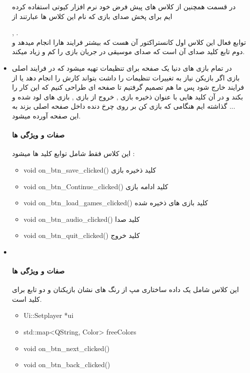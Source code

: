\documentclass[pdf,titlepage,a4paper]{report}
\begin{document}
\begin{itemize}
		در قسمت
		همچنین از کلاس های پیش فرض خود نرم افزار کیوتی استفاده کرده ایم برای پخش صدای بازی که نام این کلاس ها عبارتند از 
		
		,  . \\
		 توابع فعال این کلاس اول کانستراکتور آن هست که بیشتر فرایند هارا انجام میدهد و دوم تابع کلید صدای آن است که صدای موسیقی در جریان بازی را کم و زیاد میکند.\\
		
		\item {}  در تمام بازی های دنیا یک صفحه برای تنظیمات تهیه میشود که در فرایند اصلی بازی اگر بازیکن نیاز به تغییرات تنظیمات را داشت بتواند کارش را انجام دهد یا از فرایند خارج شود پس ما هم تصمیم گرفتیم تا صفحه ای طراحی کنیم که این کار را بکند و در آن کلید هایی با عنوان ذخیره بازی , خروج از بازی ,  بازی های لود شده و ... گذاشته ایم هنگامی که بازی کن بر روی چرخ دنده داخل صفحه اصلی بزند به این صفحه آورده میشود. \\
		\paragraph{صفات و ویژگی ها} 
         این کلاس فقط شامل توابع کلید ها میشود : 
		\begin{latin}
			\begin{itemize}
				\item void on_btn_save_clicked() کلید ذخیره بازی 
				\item void on_btn_Continue_clicked() کلید ادامه بازی
				\item void on_btn_load_games_clicked() کلید بازی های ذخیره شده
				\item void on_btn_audio_clicked() کلید صدا
				\item void on_btn_quit_clicked() کلید خروج
			\end{itemize}
		\end{latin}

		\item {} \\
		\paragraph{صفات و ویژگی ها} 
		  این کلاس شامل یک داده ساختاری مپ از رنگ های نشان بازیکنان و دو تابع برای کلید است.
		\begin{latin}
			\begin{itemize}
				\item Ui::Setplayer *ui
				\item std::map<QString, Color> freeColors
				\item void on_btn_next_clicked()
				\item void on_btn_back_clicked()
			\end{itemize}


\end{latin}
\end{itemize}
\end{document}
